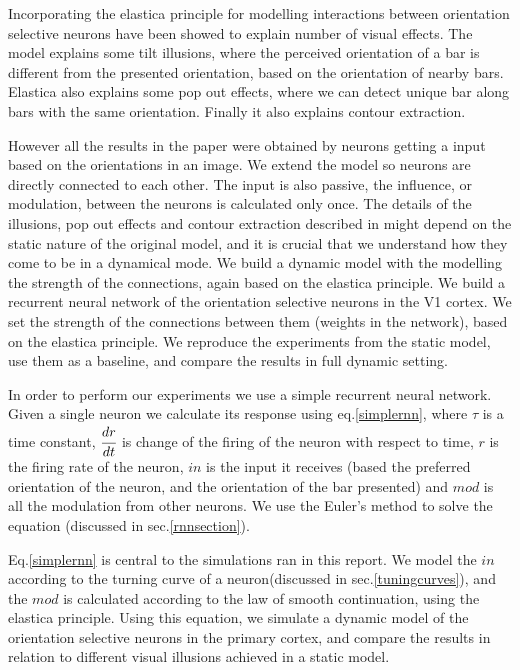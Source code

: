 Incorporating the elastica principle for modelling interactions between orientation selective neurons have been showed to explain number of visual effects\cite{keemink2015unified}. The model explains some tilt illusions, where the perceived orientation of a bar is different from the presented orientation, based on the orientation of nearby bars. Elastica also explains some pop out effects, where we can detect unique bar along bars with the same orientation. Finally it also explains contour extraction.

However all the results in the paper were obtained by neurons getting a input based on the orientations in an image. We extend the model so neurons are directly connected to each other. The input is also passive, the influence, or modulation, between the neurons is calculated only once. The details of the illusions, pop out effects and contour extraction  described in \cite{keemink2015unified} might depend on the static nature of the original model, and it is crucial that we understand how they come to be in a dynamical mode. We build a dynamic model with the modelling the strength of the connections, again based on the elastica principle. We build a recurrent neural network of the orientation selective neurons in the V1 cortex. We set the strength of the connections between them (weights in the network), based on the elastica principle. We reproduce the experiments from  the static model, use them as a baseline, and compare the results in full dynamic setting.

In order to perform our experiments we use a simple recurrent neural network. Given a single neuron we calculate its response using eq.\ref{simplernn}, where $\tau$ is a time constant, $\cfrac{dr}{dt}$ is change of the firing of the neuron with respect to time, $r$ is the firing rate of the neuron, $in$ is the input it receives (based the preferred orientation of the neuron, and the orientation of the bar presented) and $mod$ is all the modulation from other neurons. We use the Euler's method to solve the equation (discussed in sec.\ref{rnnsection}). 


Eq.\ref{simplernn} is central to the simulations ran in this report. We model the $in$ according to the turning curve of a neuron(discussed in sec.\ref{tuningcurves}), and the $mod$ is calculated according to the law of smooth continuation, using the elastica principle. Using this equation, we simulate a dynamic model of the orientation selective neurons in the primary cortex, and compare the results in relation to different visual illusions achieved in a static model\cite{keemink2015unified}.

